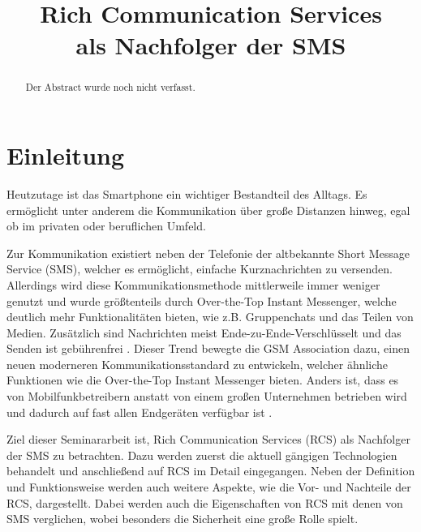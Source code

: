 \documentclass[conference]{IEEEtran}
\begin{document}
\title{Rich Communication Services\\als Nachfolger der SMS}

\author{
}

\maketitle

\begin{abstract}
    Der Abstract wurde noch nicht verfasst.
\end{abstract}

\section{Einleitung}
Heutzutage ist das Smartphone ein wichtiger Bestandteil des Alltags.
Es ermöglicht unter anderem die Kommunikation über große Distanzen hinweg, egal ob im privaten oder beruflichen Umfeld.

Zur Kommunikation existiert neben der Telefonie der altbekannte Short Message Service (SMS), welcher es ermöglicht, einfache Kurznachrichten zu versenden.
Allerdings wird diese Kommunikationsmethode mittlerweile immer weniger genutzt und wurde größtenteils durch Over-the-Top Instant Messenger, welche deutlich mehr Funktionalitäten bieten, wie z.B. Gruppenchats und das Teilen von Medien.
Zusätzlich sind Nachrichten meist Ende-zu-Ende-Verschlüsselt und das Senden ist gebührenfrei \cite{ottmobinter}.
Dieser Trend bewegte die GSM Association dazu, einen neuen moderneren Kommunikationsstandard zu entwickeln, welcher ähnliche Funktionen wie die Over-the-Top Instant Messenger bieten.
Anders ist, dass es von Mobilfunkbetreibern anstatt von einem großen Unternehmen betrieben wird und dadurch auf fast allen Endgeräten verfügbar ist \cite{uniprof,rcsmno}.

Ziel dieser Seminararbeit ist, Rich Communication Services (RCS) als Nachfolger der SMS zu betrachten.
Dazu werden zuerst die aktuell gängigen Technologien behandelt und anschließend auf RCS im Detail eingegangen.
Neben der Definition und Funktionsweise werden auch weitere Aspekte, wie die Vor- und Nachteile der RCS, dargestellt.
Dabei werden auch die Eigenschaften von RCS mit denen von SMS verglichen, wobei besonders die Sicherheit eine große Rolle spielt.
\end{document}

